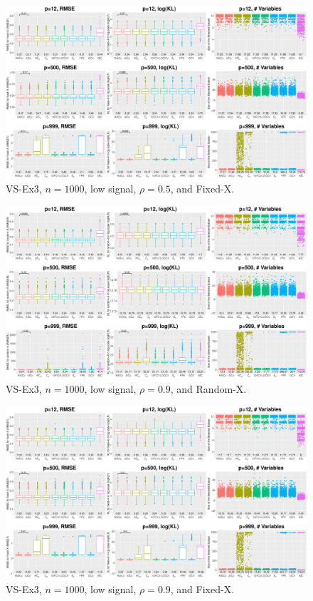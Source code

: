 \begin{figure}[!ht]
\centering
\includegraphics[width=\textwidth]{figures/supplement/fixedx_VS-Ex3_n1000_lsnr_rho05.eps}
\caption{VS-Ex3, $n=1000$, low signal, $\rho=0.5$, and Fixed-X.}
\end{figure}
\clearpage
\begin{figure}[!ht]
\centering
\includegraphics[width=\textwidth]{figures/supplement/randomx_VS-Ex3_n1000_lsnr_rho09.eps}
\caption{VS-Ex3, $n=1000$, low signal, $\rho=0.9$, and Random-X.}
\end{figure}
\begin{figure}[!ht]
\centering
\includegraphics[width=\textwidth]{figures/supplement/fixedx_VS-Ex3_n1000_lsnr_rho09.eps}
\caption{VS-Ex3, $n=1000$, low signal, $\rho=0.9$, and Fixed-X.}
\end{figure}
